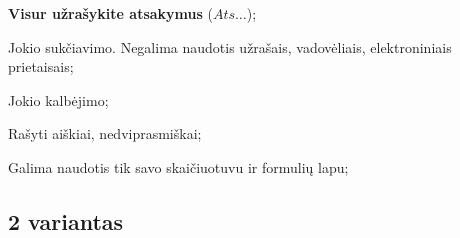 \documentclass[a4paper]{article}
\begin{document}
\begin{small}
      \begin{enumerate*}[label={(\arabic*)}]
            \item \textbf{Visur užrašykite atsakymus} ($Ats\ldots$);
            \item Jokio sukčiavimo. Negalima naudotis užrašais, vadovėliais,
            elektroniniais prietaisais;
            \item Jokio kalbėjimo;
            \item Rašyti aiškiai, nedviprasmiškai;
            \item Galima naudotis tik savo skaičiuotuvu ir formulių lapu;
      \end{enumerate*}
\end{small}
\subsection*{2 variantas}
\end{document}
